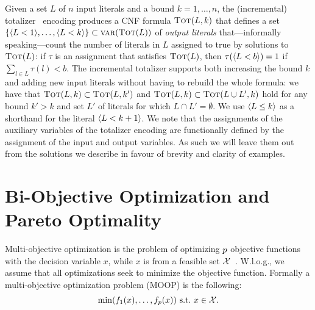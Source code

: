 Given a set $L$ of $n$ input literals and a bound $k=1, \ldots, n$, the (incremental) totalizer~\autocite{DBLP:conf/cp/BailleuxB03,DBLP:conf/cp/MartinsJML14} encoding produces a CNF formula $\textsc{Tot}(L, k)$ that defines a set $\{\langle L < 1 \rangle, \ldots, \langle L < k \rangle\} \subset \textsc{var}(\textsc{Tot}(L))$ of \emph{output literals} that---informally speaking---count the number of literals in $L$ assigned to true by solutions to $\textsc{Tot}(L)$:
if $\tau$ is an assignment that satisfies $\textsc{Tot}(L)$, then $\tau(\langle L < b \rangle) = 1$ if $\sum_{l \in L} \tau(l) < b$.
The incremental totalizer supports both increasing the bound $k$ and adding new input literals without having to rebuild the whole formula:
we have that $\textsc{Tot}(L, k) \subset \textsc{Tot}(L, k')$ and $\textsc{Tot}(L, k) \subset  \textsc{Tot}(L \cup L', k)$ hold for any bound $k' > k$ and set $L'$ of literals for which $L \cap L' =  \emptyset$. 
We use $\langle L \leq k \rangle$ as a shorthand for the literal $\langle L < k+1 \rangle$.
We note that the assignments of the auxiliary variables of the totalizer encoding are functionally defined by the assignment of the input and output variables.
As such we will leave them out from the solutions we describe in favour of brevity and clarity of examples. 

\section{Bi-Objective Optimization and Pareto Optimality\label{sec:biopt}}

Multi-objective optimization is the problem of optimizing $p$ objective functions with the decision variable $x$, while $x$ is from a feasible set $\mathcal{X}$~\autocite{Ehrgott2005-1}.
W.l.o.g., we assume that all optimizations seek to minimize the objective function.
Formally a multi-objective optimization problem (MOOP) is the following:
\begin{equation}\label{eq:moop}
  \min (f_1(x),\dots,f_p(x))\ \text{s.t.}\ x\in \mathcal{X}.
\end{equation}

